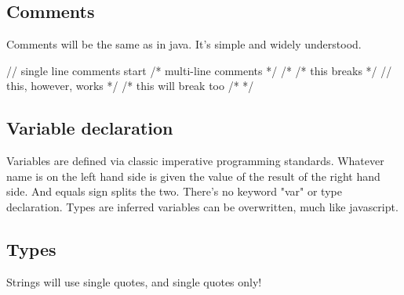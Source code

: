 \documentclass[letterpaper]{article}
\begin{document}
\subsection{Comments}
Comments will be the same as in java. It's simple and widely understood.

\begin{mdframed}
[hidealllines=true,backgroundcolor=gray!10,skipbelow=1em,skipabove=.5em]
\begin{code}
// single line comments start 
/*
	multi-line comments
*/
/*
	/* this breaks */
	// this, however, works
*/
/* this will break too /* */
\end{code}
\end{mdframed}

\subsection{Variable declaration}

Variables are defined via classic imperative programming standards. Whatever name is on the left hand side is given the value of the result of the right hand side. And equals sign splits the two. There's no keyword "var" or type declaration. Types are inferred variables can be overwritten, much like javascript.

\subsection{Types}

Strings will use single quotes, and single quotes only!
\end{document}
